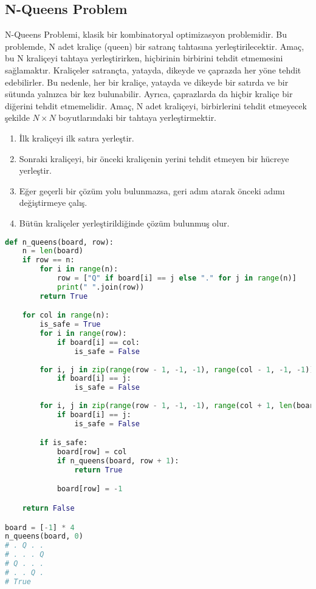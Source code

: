 \newpage

\subsection{N-Queens Problem}

N-Queens Problemi, klasik bir kombinatoryal optimizasyon problemidir. Bu problemde, N adet kraliçe (queen) bir satranç tahtasına yerleştirilecektir. Amaç, bu N kraliçeyi tahtaya yerleştirirken, hiçbirinin birbirini tehdit etmemesini sağlamaktır. Kraliçeler satrançta, yatayda, dikeyde ve çaprazda her yöne tehdit edebilirler. Bu nedenle, her bir kraliçe, yatayda ve dikeyde bir satırda ve bir sütunda yalnızca bir kez bulunabilir. Ayrıca, çaprazlarda da hiçbir kraliçe bir diğerini tehdit etmemelidir. Amaç, N adet kraliçeyi, birbirlerini tehdit etmeyecek şekilde $N \times N$ boyutlarındaki bir tahtaya yerleştirmektir.

\begin{enumerate}
    \item İlk kraliçeyi ilk satıra yerleştir.
    \item Sonraki kraliçeyi, bir önceki kraliçenin yerini tehdit etmeyen bir hücreye yerleştir.
    \item Eğer geçerli bir çözüm yolu bulunmazsa, geri adım atarak önceki adımı değiştirmeye çalış.
    \item Bütün kraliçeler yerleştirildiğinde çözüm bulunmuş olur.
\end{enumerate}

\begin{lstlisting}[language=Python]
def n_queens(board, row):
    n = len(board)
    if row == n:
        for i in range(n):
            row = ["Q" if board[i] == j else "." for j in range(n)]
            print(" ".join(row))
        return True

    for col in range(n):
        is_safe = True
        for i in range(row):
            if board[i] == col:
                is_safe = False
    
        for i, j in zip(range(row - 1, -1, -1), range(col - 1, -1, -1)):
            if board[i] == j:
                is_safe = False
    
        for i, j in zip(range(row - 1, -1, -1), range(col + 1, len(board))):
            if board[i] == j:
                is_safe = False

        if is_safe:
            board[row] = col
            if n_queens(board, row + 1):
                return True

            board[row] = -1

    return False

board = [-1] * 4
n_queens(board, 0)
# . Q . .
# . . . Q
# Q . . .
# . . Q .
# True
\end{lstlisting}

\newpage